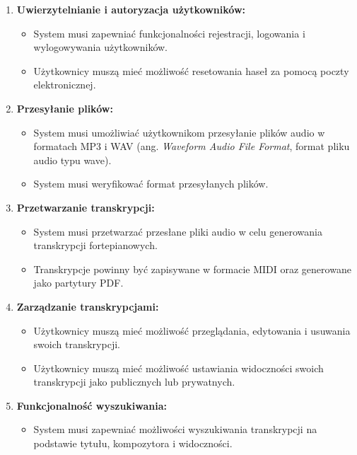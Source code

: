 \documentclass[a4paper,twoside,12pt]{book}
\begin{document}
\begin{enumerate}
	\item \textbf{Uwierzytelnianie i autoryzacja użytkowników:}
	      \begin{itemize}
	      	\item System musi zapewniać funkcjonalności rejestracji, logowania i wylogowywania użytkowników.
	      	\item Użytkownicy muszą mieć możliwość resetowania haseł za pomocą poczty elektronicznej.
	      \end{itemize}
	          
	\item \textbf{Przesyłanie plików:}
	      \begin{itemize}
	      	\item System musi umożliwiać użytkownikom przesyłanie plików audio w formatach MP3 i WAV (ang. \textit{Waveform Audio File Format}, format pliku audio typu wave).
	      	\item System musi weryfikować format przesyłanych plików.
	      \end{itemize}
	          
	\item \textbf{Przetwarzanie transkrypcji:}
	      \begin{itemize}
	      	\item System musi przetwarzać przesłane pliki audio w celu generowania transkrypcji fortepianowych.
	      	\item Transkrypcje powinny być zapisywane w formacie MIDI oraz generowane jako partytury PDF.
	      \end{itemize}
	          
	\item \textbf{Zarządzanie transkrypcjami:}
	      \begin{itemize}
	      	\item Użytkownicy muszą mieć możliwość przeglądania, edytowania i usuwania swoich transkrypcji.
	      	\item Użytkownicy muszą mieć możliwość ustawiania widoczności swoich transkrypcji jako publicznych lub prywatnych.
	      \end{itemize}
	          
	\item \textbf{Funkcjonalność wyszukiwania:}
	      \begin{itemize}
	      	\item System musi zapewniać możliwości wyszukiwania transkrypcji na podstawie tytułu, kompozytora i widoczności.
	      \end{itemize}
	          

\end{enumerate}
\end{document}
